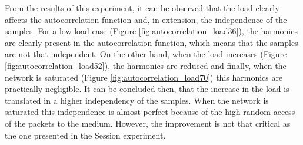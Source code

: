 From the results of this experiment, it can be observed that the load clearly affects the autocorrelation function and, in extension, the independence of the samples. For a low load case (Figure \ref{fig:autocorrelation_load36}), the harmonics are clearly present in the autocorrelation function, which means that the samples are not that independent. On the other hand, when the load increases (Figure \ref{fig:autocorrelation_load52}), the harmonics are reduced and finally, when the network is saturated (Figure \ref{fig:autocorrelation_load70}) this harmonics are practically negligible. It can be concluded then, that the increase in the load is translated in a higher independency of the samples. When the network is saturated this independence is almost perfect because of the high random access of the packets to the medium. However, the improvement is not that critical as the one presented in the Session experiment.